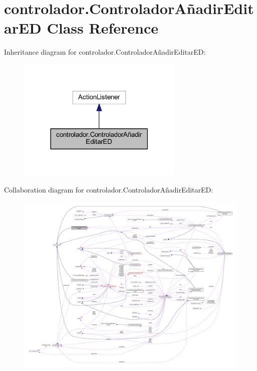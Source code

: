 \hypertarget{classcontrolador_1_1_controlador_a_xC3_xB1adir_editar_e_d}{}\section{controlador.\+Controlador\+Añadir\+Editar\+ED Class Reference}
\label{classcontrolador_1_1_controlador_a_xC3_xB1adir_editar_e_d}


Inheritance diagram for controlador.\+Controlador\+Añadir\+Editar\+ED\+:
\nopagebreak
\begin{figure}[H]
\begin{center}
\leavevmode
\includegraphics[width=225pt]{classcontrolador_1_1_controlador_a_xC3_xB1adir_editar_e_d__inherit__graph}
\end{center}
\end{figure}


Collaboration diagram for controlador.\+Controlador\+Añadir\+Editar\+ED\+:
\nopagebreak
\begin{figure}[H]
\begin{center}
\leavevmode
\includegraphics[width=350pt]{classcontrolador_1_1_controlador_a_xC3_xB1adir_editar_e_d__coll__graph}
\end{center}
\end{figure}
